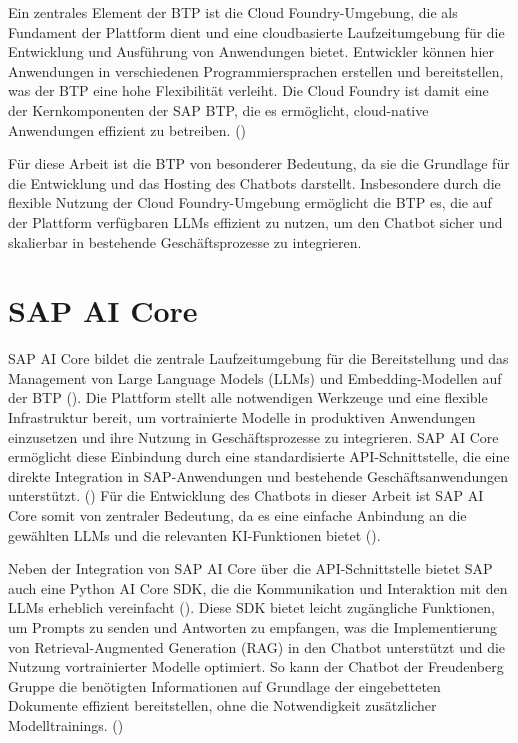 Ein zentrales Element der \ac{BTP} ist die Cloud Foundry-Umgebung, die als Fundament der Plattform dient und eine cloudbasierte Laufzeitumgebung für die Entwicklung und Ausführung von Anwendungen bietet. 
Entwickler können hier Anwendungen in verschiedenen Programmiersprachen erstellen und bereitstellen, was der \ac{BTP} eine hohe Flexibilität verleiht. 
Die Cloud Foundry ist damit eine der Kernkomponenten der SAP \ac{BTP}, die es ermöglicht, cloud-native Anwendungen effizient zu betreiben. (\cite{sap2024cloudFoundry})

Für diese Arbeit ist die \ac{BTP} von besonderer Bedeutung, da sie die Grundlage für die Entwicklung und das Hosting des Chatbots darstellt. 
Insbesondere durch die flexible Nutzung der Cloud Foundry-Umgebung ermöglicht die \ac{BTP} es, die auf der Plattform verfügbaren \acp{LLM} effizient zu nutzen, 
um den Chatbot sicher und skalierbar in bestehende Geschäftsprozesse zu integrieren.

\section{SAP AI Core}

SAP AI Core bildet die zentrale Laufzeitumgebung für die Bereitstellung und das Management von Large Language Models (\acp{LLM}) und Embedding-Modellen auf der \ac{BTP} (\cite{sap2023aiCore}). 
Die Plattform stellt alle notwendigen Werkzeuge und eine flexible Infrastruktur bereit, um vortrainierte Modelle in produktiven Anwendungen einzusetzen und ihre Nutzung in Geschäftsprozesse zu integrieren. 
SAP AI Core ermöglicht diese Einbindung durch eine standardisierte \ac{API}-Schnittstelle, die eine direkte Integration in SAP-Anwendungen und bestehende Geschäftsanwendungen unterstützt. (\cite{sap2024aiCore})
Für die Entwicklung des Chatbots in dieser Arbeit ist SAP AI Core somit von zentraler Bedeutung, da es eine einfache Anbindung an die gewählten \acp{LLM} und die relevanten \ac{KI}-Funktionen bietet (\cite[S. 9]{hrischevartificial}).

Neben der Integration von SAP AI Core über die \ac{API}-Schnittstelle bietet SAP auch eine Python AI Core \ac{SDK}, die die Kommunikation und Interaktion mit den \acp{LLM} erheblich vereinfacht (\cite{sap2024aiCore}). 
Diese \ac{SDK} bietet leicht zugängliche Funktionen, um Prompts zu senden und Antworten zu empfangen, 
was die Implementierung von Retrieval-Augmented Generation (\ac{RAG}) in den Chatbot unterstützt und die Nutzung vortrainierter Modelle optimiert. 
So kann der Chatbot der Freudenberg Gruppe die benötigten Informationen auf Grundlage der eingebetteten Dokumente effizient bereitstellen, ohne die Notwendigkeit zusätzlicher Modelltrainings. (\cite{pythonAICoreSDK})

